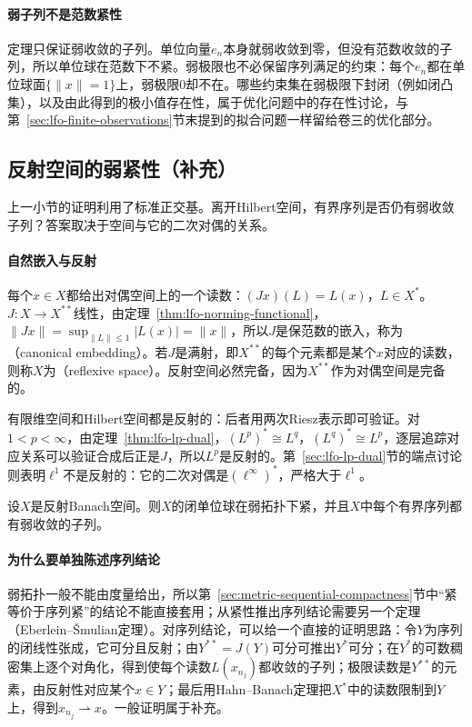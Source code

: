 \paragraph{弱子列不是范数紧性}
定理只保证弱收敛的子列。单位向量$e_n$本身就弱收敛到零，但没有范数收敛的子列，所以单位球在范数下不紧。弱极限也不必保留序列满足的约束：每个$e_n$都在单位球面$\{\|x\|=1\}$上，弱极限$0$却不在。哪些约束集在弱极限下封闭（例如闭凸集），以及由此得到的极小值存在性，属于优化问题中的存在性讨论，与第~\ref{sec:lfo-finite-observations}节末提到的拟合问题一样留给卷三的优化部分。

\subsection{反射空间的弱紧性（补充）}
\label{sec:lfo-reflexive}

上一小节的证明利用了标准正交基。离开Hilbert空间，有界序列是否仍有弱收敛子列？答案取决于空间与它的二次对偶的关系。

\paragraph{自然嵌入与反射}
每个$x\in X$都给出对偶空间上的一个读数：$(Jx)(L)=L(x)$，$L\in X^*$。$J:X\to X^{**}$线性，由定理~\ref{thm:lfo-norming-functional}，$\|Jx\|=\sup_{\|L\|\leq1}|L(x)|=\|x\|$，所以$J$是保范数的嵌入，称为（canonical embedding）。若$J$是满射，即$X^{**}$的每个元素都是某个$x$对应的读数，则称$X$为（reflexive space）。反射空间必然完备，因为$X^{**}$作为对偶空间是完备的。

有限维空间和Hilbert空间都是反射的：后者用两次Riesz表示即可验证。对$1<p<\infty$，由定理~\ref{thm:lfo-lp-dual}，$(L^p)^*\cong L^q$，$(L^q)^*\cong L^p$，逐层追踪对应关系可以验证合成后正是$J$，所以$L^p$是反射的。第~\ref{sec:lfo-lp-dual}节的端点讨论则表明$\ell^1$不是反射的：它的二次对偶是$(\ell^\infty)^*$，严格大于$\ell^1$。

\begin{theorem}[反射空间的弱紧性]
\label{thm:lfo-reflexive-compact}
设$X$是反射Banach空间。则$X$的闭单位球在弱拓扑下紧，并且$X$中每个有界序列都有弱收敛的子列。
\end{theorem}

\paragraph{为什么要单独陈述序列结论}
弱拓扑一般不能由度量给出，所以第~\ref{sec:metric-sequential-compactness}节中“紧等价于序列紧”的结论不能直接套用；从紧性推出序列结论需要另一个定理（Eberlein--Šmulian定理）。对序列结论，可以给一个直接的证明思路：令$Y$为序列的闭线性张成，它可分且反射；由$Y^{**}=J(Y)$可分可推出$Y^*$可分；在$Y^*$的可数稠密集上逐个对角化，得到使每个读数$L(x_{n_j})$都收敛的子列；极限读数是$Y^{**}$的元素，由反射性对应某个$x\in Y$；最后用Hahn--Banach定理把$X^*$中的读数限制到$Y$上，得到$x_{n_j}\rightharpoonup x$。一般证明属于补充。

